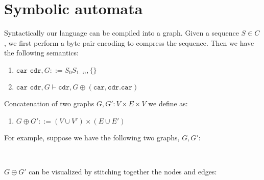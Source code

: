 \documentclass[11pt]{article}
\begin{document}
\pagebreak
  \section{Symbolic automata}

  Syntactically our language can be compiled into a graph. Given a sequence $S\in C$, we first perform a byte pair encoding to compress the sequence. Then we have the following semantics:

\begin{enumerate}
  \item $\texttt{car cdr}, G ::= S_0 S_{1\ldots n}, \{\}$
  \item $\texttt{car cdr}, G \vdash \texttt{cdr}, G \oplus (\texttt{car}, \texttt{cdr.car})$
\end{enumerate}

  Concatenation of two graphs $G, G': V\times E \times V$ we define as:

\begin{enumerate}
  \item $G \oplus G' ::= (V\cup V')\times (E\cup E') $
\end{enumerate}

  For example, suppose we have the following two graphs, $G, G'$:\\
\begin{figure}[H]
 \centering
{}\\
\end{figure}

$G\oplus G'$ can be visualized by stitching together the nodes and edges:\\
\end{document}
